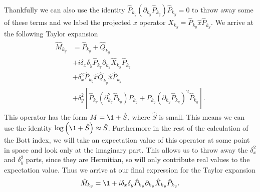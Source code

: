 Thankfully we can also use the identity $\hat P_{k_y}  \left ( \partial_{k_y} \hat P_{k_y} \right ) \hat P_{k_y} = 0$ to throw away some of these terms and we label the projected $x$ operator $\hat X_{k_y} = \hat P_{k_y} \hat x  \hat P_{k_y}$. We arrive at the following Taylor expansion
\begin{align}
	\begin{split}
		\hat M_{k_y}  &= \hat P_{k_y} + \hat Q_{k_y} \\
		&+i  \delta_x \delta_y \hat P_{k_y} \partial_{k_y} \hat X_{k_y} \hat P_{k_y} \\ 
		&+ \delta_x^2 \hat P_{k_y} \hat x  \hat Q_{k_y} \hat x \hat P_{k_y} \\
		&+ \delta_y^2 \left [\hat P_{k_y} \left ( \partial_{k_y}^2 \hat P_{k_y}  \right ) \hat P_{k_y} +  \hat P_{k_y}    \left ( \partial_{k_y} \hat P_{k_y } \right )^2 \hat P_{k_y} \right ].
	\end{split}
\end{align}
This operator has the form $M = \1 + \hat S$, where $\hat S$ is small. This means we can use the identity $\log \left ( \1 + \hat S \right ) \approx \hat S$. Furthermore in the rest of the calculation of the Bott index, we will take an expectation value of this operator at some point in space and look only at the imaginary part. This allows us to throw away the $\delta_x ^2$ and $\delta_y^2$ parts, since they are Hermitian, so will only contribute real values to the expectation value. Thus we arrive at our final expression for the Taylor expansion
\begin{align}
	\begin{split}
		\hat M_{k_y}  = \1
		+i \delta_x \delta_y \hat P_{k_y} \partial_{k_y} \hat X_{k_y} \hat P_{k_y} .
	\end{split}
\end{align}





